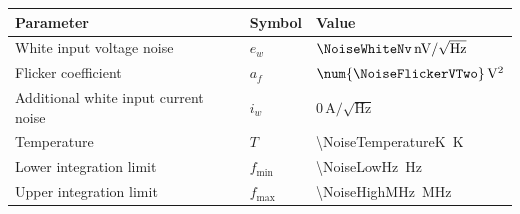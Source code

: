 \begin{tabular}{lll}
\toprule
Parameter & Symbol & Value \\
\midrule
White input voltage noise & $e_w$ & $\NoiseWhiteNv\,\mathrm{nV}/\sqrt{\mathrm{Hz}}$ \\
Flicker coefficient & $a_f$ & $\num{\NoiseFlickerVTwo}\,\mathrm{V^2}$ \\
Additional white input current noise & $i_w$ & $0\,\mathrm{A}/\sqrt{\mathrm{Hz}}$ \\
Temperature & $T$ & \SI{\NoiseTemperatureK}{K} \\
Lower integration limit & $f_{\min}$ & \SI{\NoiseLowHz}{Hz} \\
Upper integration limit & $f_{\max}$ & \SI{\NoiseHighMHz}{MHz} \\
\bottomrule
\end{tabular}
